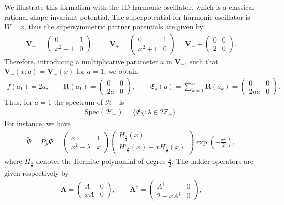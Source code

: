 \documentclass[10pt,a4paper]{amsart}
\numberwithin{equation}{section}
\begin{document}
We illustrate this formalism with the 1D-harmonic oscillator, which is a classical rational shape invariant potential. The superpotential for harmonic oscillator is $W=x$, thus the supersymmetric partner potentials are given by
\begin{gather*}
\mathbf{V}_-=\begin{pmatrix}0&1\\x^2- 1&0\end{pmatrix}\!, \qquad \mathbf{V}_+=\begin{pmatrix}0&1\\x^2+1&0\end{pmatrix}=\mathbf{V}_-+\begin{pmatrix}0&0\\2&0\end{pmatrix}\!.
\end{gather*}
Therefore, introducing a multiplicative parameter $a$ in $\mathbf{V}_-$, such that $\mathbf{V}_-(x;a)=\mathbf{V}_-(x)$ for $a=1$, we obtain
\begin{gather*}
f(a_1)=2a,\qquad \mathbf{R}(a_1)=\begin{pmatrix}0&0\\2a&0\end{pmatrix}\!,\qquad \mathfrak{E}_{\lambda} (a) = \sum_{k=1}^n \mathbf{R}(a_k)=\begin{pmatrix}0&0\\2na&0\end{pmatrix}\!.
\end{gather*}
Thus, for $a=1$ the spectrum of $\mathcal H_-$ is
\begin{gather*}
\mathrm{Spec}(\mathcal H_-)=\{\mathfrak E_\lambda\colon\lambda\in 2\mathbb{Z}_+\}.
\end{gather*}
For instance, we have
\begin{gather*}
\widetilde{\Psi}=P_\lambda\Psi=\begin{pmatrix}
x&1\\x^2-\lambda&x\end{pmatrix}\begin{pmatrix}
H_{\frac{\lambda}{2}}(x)\\H'_{\frac{\lambda}{2}}(x)-xH_{\frac{\lambda}{2}}(x)
\end{pmatrix}\exp\left({-}\frac{x^2}{2}\right),
\end{gather*}
where $H_{\frac{\lambda}{2}}$ denotes the Hermite polynomial of degree $\frac{\lambda}{2}$. The ladder operators are given respectively by
\begin{gather*}
\mathbf{A}=\begin{pmatrix}
A&0\\xA&0\end{pmatrix}\!,\qquad \mathbf{A}^\dag=\begin{pmatrix}
A^\dag&0\\2-xA^\dag&0\end{pmatrix}\!,
\end{gather*}
\end{document}
